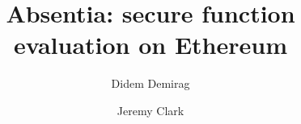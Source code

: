 \documentclass[envcountsect]{llncs}
\begin{document}
	
\frontmatter
\mainmatter

\title{\Large \bf Absentia: secure function evaluation on Ethereum}

\author{Didem Demirag \and Jeremy Clark}

\maketitle












\clearpage
\appendix
\end{document}
